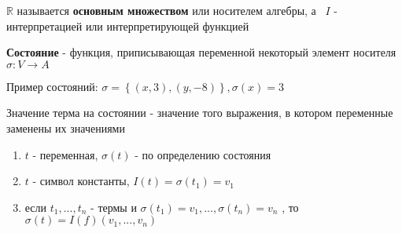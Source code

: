\documentclass[../main/document.tex]{subfiles}
\begin{document}
\begin{dfn}
$\mathbb{R}$ называется \textbf{основным множеством} или носителем алгебры, а \
$I$ - интерпретацией или интерпретирующей функцией
\end{dfn}

\begin{dfn}
\textbf{Состояние} - функция, приписывающая переменной некоторый элемент носителя $\sigma :V\rightarrow A$
\end{dfn}

\begin{exm}
Пример состояний: $\sigma = \left\{(x,3),(y,-8)\right\}, \sigma(x)=3$
\end{exm}

\begin{dfn}
Значение терма на состоянии - значение того выражения, в котором переменные заменены их значениями

\begin{enumerate}
\item $t$ - переменная, $\sigma(t)$ - по определению состояния
\item $t$ - символ константы, $I(t)=\sigma(t_1)=v_1$
\item если $t_1,...,t_n$ - термы и $\sigma(t_1)=v_1,...,\sigma(t_n)=v_n$ , то $\sigma(t)=I(f)(v_1,...,v_n)$
\end{enumerate}
\end{dfn}
\end{document}
